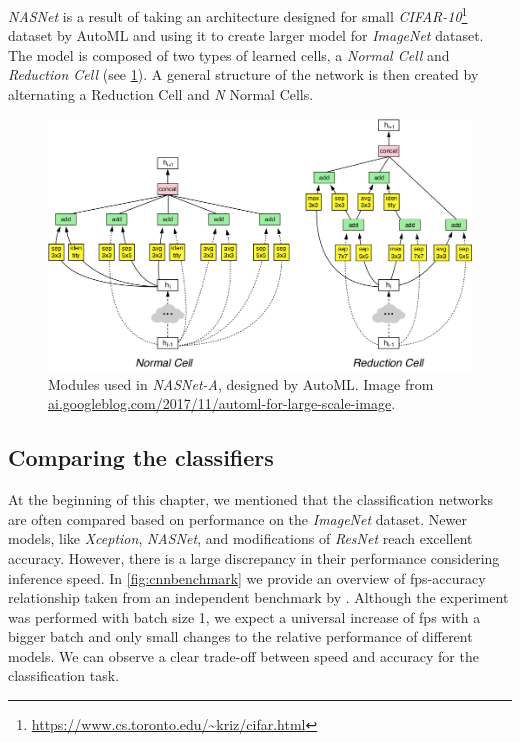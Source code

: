 \textit{NASNet} is a result of taking an architecture designed for small \textit{CIFAR-10}\footnote{\url{https://www.cs.toronto.edu/~kriz/cifar.html}} dataset by AutoML and using it to create larger model for \textit{ImageNet} dataset. The model is composed of two types of learned cells, a \textit{Normal Cell} and \textit{Reduction Cell} (see \cref{fig:nasnet}). A general structure of the network is then created by alternating a Reduction Cell and \textit{N} Normal Cells.

\begin{figure}
    \includegraphics[width=\textwidth]{img/nasnet}
    \caption[NASNet-A modules]
    {Modules used in \textit{NASNet-A}, designed by AutoML. Image from \url{ai.googleblog.com/2017/11/automl-for-large-scale-image}.}
    \label{fig:nasnet}
\end{figure}

\subsection{Comparing the classifiers}
At the beginning of this chapter, we mentioned that the classification networks are often compared based on performance on the \textit{ImageNet} dataset. Newer models, like \textit{Xception}, \textit{NASNet}, and modifications of \textit{ResNet} reach excellent accuracy. However, there is a large discrepancy in their performance considering inference speed. In \cref{fig:cnnbenchmark} we provide an overview of fps-accuracy relationship taken from an independent benchmark by \citeauthor{bib:cnnbenchmark} \cite{bib:cnnbenchmark}. Although the experiment was performed with batch size 1, we expect a universal increase of fps with a bigger batch and only small changes to the relative performance of different models. We can observe a clear trade-off between speed and accuracy for the classification task.

